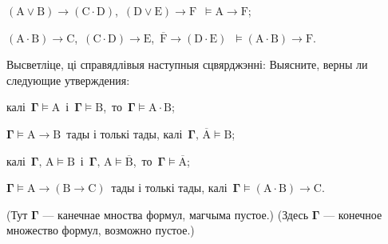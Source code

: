 \begin{problemList}
{\begin{belarusianEnumerate}
\item $(\boldsymbol{\mathrm{A}} \vee \boldsymbol{\mathrm{B}}) \to (\boldsymbol{\mathrm{C}} \cdot
\boldsymbol{\mathrm{D}})$,\, $(\boldsymbol{\mathrm{D}} \vee \boldsymbol{\mathrm{E}}) \to
\boldsymbol{\mathrm{F}}$\, $\vDash \boldsymbol{\mathrm{A}} \to \boldsymbol{\mathrm{F}}$;

\item $(\boldsymbol{\mathrm{A}} \cdot \boldsymbol{\mathrm{B}}) \to \boldsymbol{\mathrm{C}}$,\,
$(\boldsymbol{\mathrm{C}} \cdot \boldsymbol{\mathrm{D}}) \to \boldsymbol{\mathrm{E}}$,\,
$\overline{\boldsymbol{\mathrm{F}}} \to (\boldsymbol{\mathrm{D}} \cdot \boldsymbol{\mathrm{E}})$\,
$\vDash (\boldsymbol{\mathrm{A}} \cdot \boldsymbol{\mathrm{B}}) \to \boldsymbol{\mathrm{F}}$.

\end{belarusianEnumerate}
}

\smallskip

\problemItemWithCommonPartComplicated
{Высветліце, ці справядлівыя наступныя сцвярджэнні:}
{Выясните, верны ли следующие утверждения:}
{%
\begin{belarusianEnumerate}

\item калі\, $\boldsymbol{\Gamma} \vDash \boldsymbol{\mathrm{A}}$\, і\, $\boldsymbol{\Gamma}
\vDash \boldsymbol{\mathrm{B}}$,\, то\, $\boldsymbol{\Gamma} \vDash \boldsymbol{\mathrm{A}} \cdot
\boldsymbol{\mathrm{B}}$;

\item $\boldsymbol{\Gamma} \vDash \boldsymbol{\mathrm{A}} \to \boldsymbol{\mathrm{B}}$\, тады
і толькі тады, калі\, $\boldsymbol{\Gamma},\, \overline{\boldsymbol{\mathrm{A}}} \vDash \boldsymbol{\mathrm{B}}$;

\item калі\, $\boldsymbol{\Gamma},\, \boldsymbol{\mathrm{A}} \vDash \boldsymbol{\mathrm{B}}$\, і\,
$\boldsymbol{\Gamma},\, \boldsymbol{\mathrm{A}} \vDash \overline{\boldsymbol{\mathrm{B}}}$,\, то\,
$\boldsymbol{\Gamma} \vDash \overline{\boldsymbol{\mathrm{A}}}$;

\item $\boldsymbol{\Gamma} \vDash \boldsymbol{\mathrm{A}} \to (\boldsymbol{\mathrm{B}}
\to \boldsymbol{\mathrm{C}})$\, тады і толькі тады, калі\, $\boldsymbol{\Gamma} \vDash (\boldsymbol{\mathrm{A}} \cdot \boldsymbol{\mathrm{B}}) \to \boldsymbol{\mathrm{C}}$.

\end{belarusianEnumerate}
}
{(Тут $\boldsymbol{\Gamma}$ --- канечнае мноства формул, магчыма пустое.)}
{(Здесь $\boldsymbol{\Gamma}$ --- конечное множество формул, возможно пустое.)}

\end{problemList}



